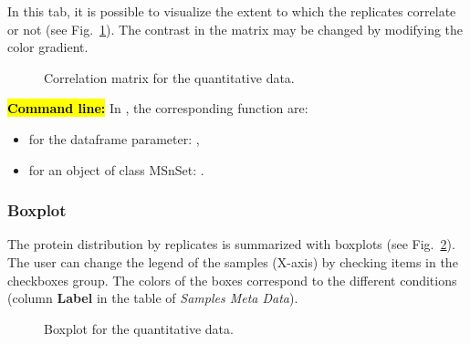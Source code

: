 \documentclass[12pt]{article}
\begin{document}
{{In this tab, it is possible to visualize the extent to which the replicates 
correlate or not (see Fig.~\ref{fig:sdcm}). The contrast in the matrix may be 
changed by modifying the color gradient.}

\begin {figure}
\centering
{}
\caption{Correlation matrix for the quantitative data.}\label{fig:sdcm}
\end {figure}

\hl{\bf Command line:} In , the corresponding function are:
\begin{itemize}
\item for the dataframe parameter: ,
\item for an object of class MSnSet: .
\end{itemize}


\subsubsection {Boxplot}\label{sec:boxplot}

The protein distribution by replicates is summarized with boxplots 
(see Fig.~\ref{fig:boxplot}). The user can change the legend of the samples 
(X-axis) by checking items in the checkboxes group. The colors of the boxes 
correspond to the different conditions (column \textbf{Label} in the table of 
\emph {Samples Meta Data}).

\begin {figure}
\centering
{}
\caption{Boxplot for the quantitative data.}\label{fig:boxplot}
\end {figure}



}
\end{document}
